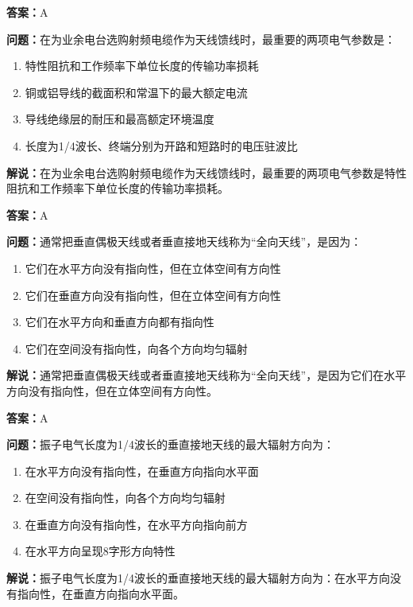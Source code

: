 \textbf{答案：}A

\textbf{问题：}在为业余电台选购射频电缆作为天线馈线时，最重要的两项电气参数是：

\begin{enumerate}[label=\Alph*), leftmargin=1cm]
	\item 特性阻抗和工作频率下单位长度的传输功率损耗
	\item 铜或铝导线的截面积和常温下的最大额定电流
	\item 导线绝缘层的耐压和最高额定环境温度
	\item 长度为1/4波长、终端分别为开路和短路时的电压驻波比
\end{enumerate}

\textbf{解说：}在为业余电台选购射频电缆作为天线馈线时，最重要的两项电气参数是特性阻抗和工作频率下单位长度的传输功率损耗。%

\textbf{答案：}A

\textbf{问题：}通常把垂直偶极天线或者垂直接地天线称为“全向天线”，是因为：

\begin{enumerate}[label=\Alph*), leftmargin=1cm]
	\item 它们在水平方向没有指向性，但在立体空间有方向性
	\item 它们在垂直方向没有指向性，但在立体空间有方向性
	\item 它们在水平方向和垂直方向都有指向性
	\item 它们在空间没有指向性，向各个方向均匀辐射
\end{enumerate}

\textbf{解说：}通常把垂直偶极天线或者垂直接地天线称为“全向天线”，是因为它们在水平方向没有指向性，但在立体空间有方向性。%

\textbf{答案：}A

\textbf{问题：}振子电气长度为1/4波长的垂直接地天线的最大辐射方向为：

\begin{enumerate}[label=\Alph*), leftmargin=1cm]
	\item 在水平方向没有指向性，在垂直方向指向水平面
	\item 在空间没有指向性，向各个方向均匀辐射
	\item 在垂直方向没有指向性，在水平方向指向前方
	\item 在水平方向呈现8字形方向特性
\end{enumerate}

\textbf{解说：}振子电气长度为1/4波长的垂直接地天线的最大辐射方向为：在水平方向没有指向性，在垂直方向指向水平面。%

